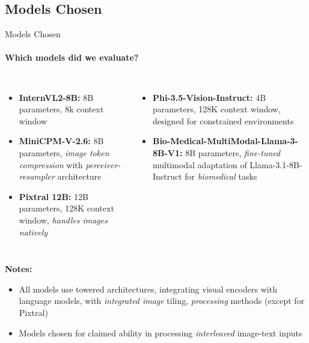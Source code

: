 \subsection{Models Chosen}
\begin{frame}{Models Chosen}
\framesubtitle{Which models did we evaluate?}
  \vspace{-1em}
  \begin{columns}[T]
    \column{\customcolumnwidth}
    \begin{itemize}
      \item \textbf{InternVL2-8B:} 8B parameters, 8k context window
      \item \textbf{MiniCPM-V-2.6:} 8B parameters, \emph{image token compression} with \emph{perceiver-resampler} architecture
      \item \textbf{Pixtral 12B:} 12B parameters, 128K context window, \emph{handles images natively}
    \end{itemize}
    \column{\customcolumnwidth}
    \begin{itemize}
      \item \textbf{Phi-3.5-Vision-Instruct:} 4B parameters, 128K context window, designed for constrained environments
      \item \textbf{Bio-Medical-MultiModal-Llama-3-8B-V1:} 8B parameters, \emph{fine-tuned} multimodal adaptation of Llama-3.1-8B-Instruct for \emph{biomedical} tasks
    \end{itemize}
  \end{columns}
  \textbf{Notes:}
  \begin{itemize}
    \setlength{\itemsep}{0em}
    \item All models use towered architectures, integrating visual encoders with language models, with \emph{integrated image} tiling, \emph{processing} methods (except for Pixtral)
    \item Models chosen for claimed ability in processing \emph{interleaved} image-text inputs
  \end{itemize}
\end{frame}


